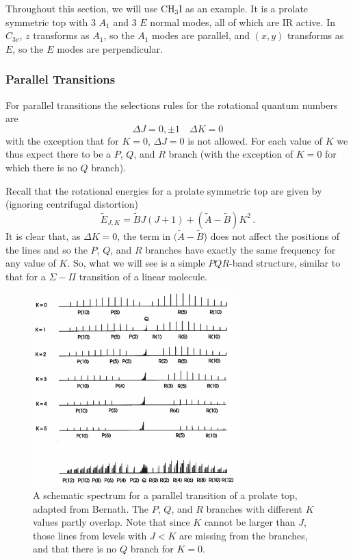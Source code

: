 \documentclass{article}
\theoremstyle{plain}\theoremheaderfont{\normalfont\itshape}\theorembodyfont{\rmfamily}\theoremseparator{.}\newtheorem*{rem}{Remark}\newtheorem*{ex}{Example}\newtheorem*{proof}{Proof}\newtheorem*{altp}{Alternative proof}
\theoremstyle{plain}\theoremheaderfont{\normalfont\bfseries}\theorembodyfont{\rmfamily}\theoremseparator{.}\newtheorem{thm}{Theorem}[section]\newtheorem{lem}[thm]{Lemma}\newtheorem{prop}[thm]{Proposition}\newtheorem*{cor}{Corollary}\newtheorem{defn}[thm]{Definition}\newtheorem{clm}[thm]{Claim}\newtheorem{clminproof}{Claim}\newtheorem{pos}{Postulate}[section]
\theoremstyle{break}\theoremheaderfont{\normalfont\itshape}\theorembodyfont{\rmfamily}\theoremseparator{.\medskip}\newtheorem*{proofskip}{Proof}\newtheorem*{exs}{Examples}\newtheorem*{rems}{Remarks}
\theoremstyle{break}\theoremheaderfont{\normalfont\bfseries}\theorembodyfont{\rmfamily}\theoremseparator{.\medskip}\newtheorem{lemskip}[thm]{Lemma}\newtheorem{defnskip}[thm]{Definition}\newtheorem{propskip}[thm]{Proposition}\newtheorem{thmskip}[thm]{Theorem}
\numberwithin{equation}{section}
\begin{document}
    Throughout this section, we will use \(\mathrm{CH_3I}\) as an example. It is a prolate symmetric top with 3 \(A_1\) and 3 \(E\) normal modes, all of which are IR active. In \(C_{3v}\), \(z\) transforms as \(A_1\), so the \(A_1\) modes are parallel, and \((x,y)\) transforms as \(E\), so the \(E\) modes are perpendicular.

    \subsubsection*{Parallel Transitions}
    For parallel transitions the selections rules for the rotational quantum numbers are
    \begin{equation}
        \Delta J=0,\pm 1\quad \Delta K=0
    \end{equation}
    with the exception that for \(K=0\), \(\Delta J=0\) is not allowed. For each value of \(K\) we thus expect there to be a \(P\), \(Q\), and \(R\) branch (with the exception of \(K=0\) for which there is no \(Q\) branch).

    Recall that the rotational energies for a prolate symmetric top are given by (ignoring centrifugal distortion)
    \begin{equation}
        \tilde{E}_{J,K}=\tilde{B}J(J+1)+(\tilde{A}-\tilde{B})K^2\,.
    \end{equation}
    It is clear that, as \(\Delta K=0\), the term in \((\tilde{A}-\tilde{B}\)) does not affect the positions of the lines and so the \(P\), \(Q\), and \(R\) branches have exactly the same frequency for any value of \(K\). So, what we will see is a simple \(PQR\)-band structure, similar to that for a \(\Sigma-\Pi\) transition of a linear molecule.

    \begin{figure}
        \centering
        \includegraphics[width=0.7\textwidth]{prolate_top_parallel.png}
        \caption{A schematic spectrum for a parallel transition of a prolate top, adapted from Bernath. The \(P\), \(Q\), and \(R\) branches with different \(K\) values partly overlap. Note that since \(K\) cannot be larger than \(J\), those lines from levels with \(J<K\) are missing from the branches, and that there is no \(Q\) branch for \(K=0\).}
    \end{figure}
\end{document}
